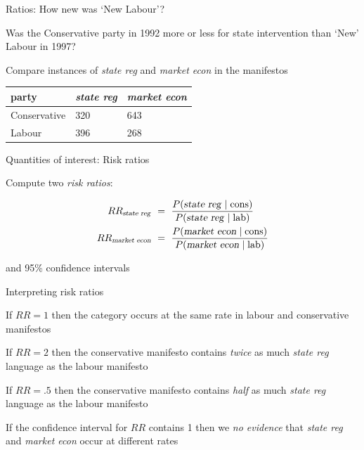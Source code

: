 \documentclass{hertieteaching}
\begin{document}
\begin{frame}{Ratios: How new was `New Labour'?}
\protect\hypertarget{ratios-how-new-was-new-labour}{}

Was the Conservative party in 1992 more or less for state intervention
than `New' Labour in 1997?

Compare instances of \emph{state reg} and \emph{market econ} in the
manifestos

\begin{longtable}[]{@{}lll@{}}
\toprule
party & \emph{state reg} & \emph{market econ}\tabularnewline
\midrule
\endhead
Conservative & 320 & 643\tabularnewline
Labour & 396 & 268\tabularnewline
\bottomrule
\end{longtable}

\end{frame}

\begin{frame}{Quantities of interest: Risk ratios}
\protect\hypertarget{quantities-of-interest-risk-ratios}{}

Compute two \emph{risk ratios}:

\[
\begin{aligned}
RR_{\text{\textsl{state reg}}} & ~=~ \frac{P(\text{\textsl{state reg}} \mid \text{cons})}
{P(\text{\textsl{state reg}} \mid \text{lab})}\\
RR_{\text{\textsl{market econ}}} & ~=~ \frac{P(\text{\textsl{market econ}} \mid \text{cons})}
{P(\text{\textsl{market econ}} \mid \text{lab})}
\end{aligned}
\]

and 95\% confidence intervals

\end{frame}

\begin{frame}{Interpreting risk ratios}
\protect\hypertarget{interpreting-risk-ratios}{}

If \(RR=1\) then the category occurs at the same rate in labour and
conservative manifestos

If \(RR=2\) then the conservative manifesto contains \emph{twice} as
much \emph{state reg} language as the labour manifesto

If \(RR=.5\) then the conservative manifesto contains \emph{half} as
much \emph{state reg} language as the labour manifesto

If the confidence interval for \(RR\) contains 1 then we \emph{no
evidence} that \emph{state reg} and \emph{market econ} occur at
different rates

\end{frame}
\end{document}
